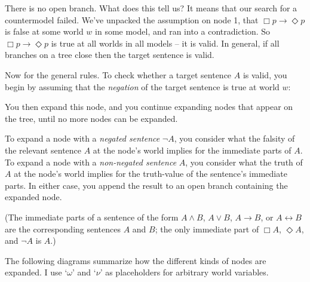 There is no open branch. What does
this tell us? It means that our search for a countermodel failed. We've unpacked
the assumption on node 1, that $\Box p \to \Diamond p$ is false at some world
$w$ in some model, and ran into a contradiction. So $\Box p \to \Diamond p$ is
true at all worlds in all models -- it is valid. In general, if all branches on
a tree close then the target sentence is valid.

Now for the general rules. To check whether a target sentence $A$ is valid, you
begin by assuming that the \emph{negation} of the target sentence is true at world $w$:
%
\begin{center}
\end{center}
%
You then expand this node, and you continue expanding nodes that appear on
the tree, until no more nodes can be expanded.

To expand a node with a \emph{negated sentence} $\neg A$, you consider what the
falsity of the relevant sentence $A$ at the node's world implies for the
immediate parts of $A$. To expand a node with a \emph{non-negated sentence} $A$,
you consider what the truth of $A$ at the node's world implies for the
truth-value of the sentence's immediate parts. In either case, you append the
result to an open branch containing the expanded node.

(The immediate parts of a sentence of the form $A\land B$, $A \lor B$,
$A \to B$, or $A \leftrightarrow B$ are the corresponding sentences $A$ and $B$;
the only immediate part of $\Box A$, $\Diamond A$, and $\neg A$ is $A$.)

The following diagrams summarize how the different kinds of nodes are expanded.
I use `$\omega$' and `$\nu$' as placeholders for arbitrary world variables.

\bigskip\noindent%
\begin{minipage}{0.33\textwidth}\centering
{}
\end{minipage}
\begin{minipage}{0.33\textwidth}\centering
{}
\end{minipage}
\begin{minipage}{0.33\textwidth}\centering
{}
\end{minipage}

